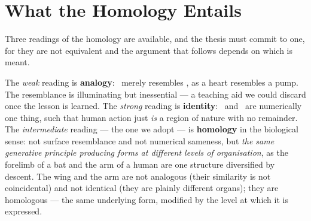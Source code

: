 \begin{center}
\end{center}

\section{What the Homology Entails}

Three readings of the homology are available, and the thesis must commit to one,
for they are not equivalent and the argument that follows depends on which is
meant.

The \emph{weak} reading is \textbf{analogy}: \praxis\ merely resembles \physis,
as a heart resembles a pump. The resemblance is illuminating but inessential ---
a teaching aid we could discard once the lesson is learned. The \emph{strong}
reading is \textbf{identity}: \praxis\ and \physis\ are numerically one thing,
such that human action just \emph{is} a region of nature with no remainder. The
\emph{intermediate} reading --- the one we adopt --- is \textbf{homology} in the
biological sense: not surface resemblance and not numerical sameness, but
\emph{the same generative principle producing forms at different levels of
organisation}, as the forelimb of a bat and the arm of a human are one structure
diversified by descent. The wing and the arm are not analogous (their similarity
is not coincidental) and not identical (they are plainly different organs); they
are homologous --- the same underlying form, modified by the level at which it
is expressed.

